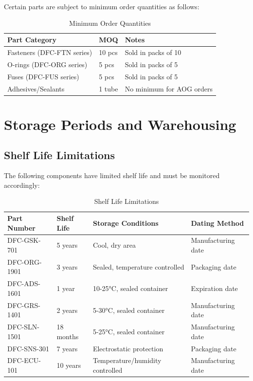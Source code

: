 \documentclass[12pt,a4paper,twoside,openright]{book}
\newcommand{\tabletextfont}{\normalfont\rmfamily}
\newcommand{\tableheadfont}{\normalfont\bfseries}
\begin{document}
Certain parts are subject to minimum order quantities as follows:

\begin{table}[h]
\centering
\setlength{\tabcolsep}{5pt} %
\begin{tabular}{|p{}|p{}|p{}|}
\hline
\tableheadfont\textbf{Part Category} & \tableheadfont\textbf{MOQ} & \tableheadfont\textbf{Notes} \\
\hline
\tabletextfont Fasteners (DFC-FTN series) & 10 pcs & Sold in packs of 10 \\
\hline
\tabletextfont O-rings (DFC-ORG series) & 5 pcs & Sold in packs of 5 \\
\hline
\tabletextfont Fuses (DFC-FUS series) & 5 pcs & Sold in packs of 5 \\
\hline
\tabletextfont Adhesives/Sealants & 1 tube & No minimum for AOG orders \\
\hline
\end{tabular}
\caption{Minimum Order Quantities}
\end{table}

\section{Storage Periods and Warehousing}

\subsection{Shelf Life Limitations}

The following components have limited shelf life and must be monitored accordingly:

\begin{table}[h]
\centering
\setlength{\tabcolsep}{5pt} %
\begin{tabular}{|p{}|p{}|p{}|p{}|}
\hline
\tableheadfont\textbf{Part Number} & \tableheadfont\textbf{Shelf Life} & \tableheadfont\textbf{Storage Conditions} & \tableheadfont\textbf{Dating Method} \\
\hline
\tabletextfont DFC-GSK-701 & 5 years & Cool, dry area & Manufacturing date \\
\hline
\tabletextfont DFC-ORG-1901 & 3 years & Sealed, temperature controlled & Packaging date \\
\hline
\tabletextfont DFC-ADS-1601 & 1 year & 10-25°C, sealed container & Expiration date \\
\hline
\tabletextfont DFC-GRS-1401 & 2 years & 5-30°C, sealed container & Manufacturing date \\
\hline
\tabletextfont DFC-SLN-1501 & 18 months & 5-25°C, sealed container & Manufacturing date \\
\hline
\tabletextfont DFC-SNS-301 & 7 years & Electrostatic protection & Packaging date \\
\hline
\tabletextfont DFC-ECU-101 & 10 years & Temperature/humidity controlled & Manufacturing date \\
\hline
\end{tabular}
\caption{Shelf Life Limitations}
\end{table}
\end{document}

